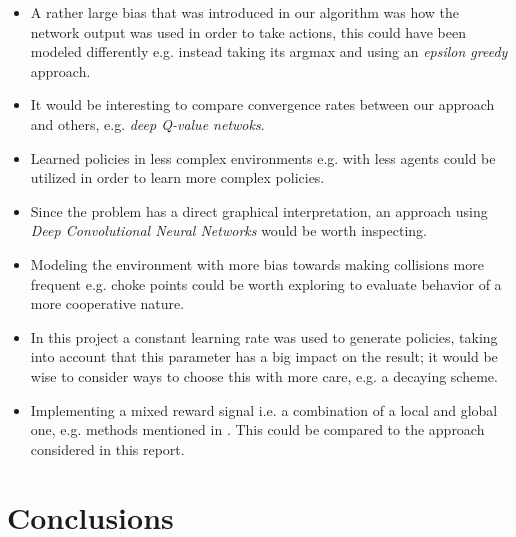 \documentclass[journal,twoside]{IEEEtran}
\begin{document}
\begin{itemize}
\item A rather large bias that was introduced in our algorithm was how the network output was used in order to take actions, this could have been modeled differently e.g. instead taking its argmax and using an \textit{epsilon greedy}\cite{epsilon} approach.  

\item It would be interesting to compare convergence rates between our approach and others, e.g. \textit{deep Q-value netwoks}\cite{Qlearn}.

\item Learned policies in less complex environments e.g. with less agents could be utilized in order to learn more complex policies.

\item Since the problem has a direct graphical interpretation, an approach using \textit{Deep Convolutional Neural Networks} \cite{Conv} would be worth inspecting. 

\item Modeling the environment with more bias towards making collisions more frequent e.g. choke points could be worth exploring to evaluate behavior of a more cooperative nature.

\item In this project a constant learning rate was used to generate policies, taking into account that this parameter has a big impact on the result; it would be wise to consider ways to choose this with more care, e.g. a decaying scheme.

\item Implementing a mixed reward signal i.e. a combination of a local and global one, e.g. methods mentioned in \cite{Reward}. This could be compared to the approach considered in this report. 

\end{itemize}

\section{Conclusions}
\end{document}
